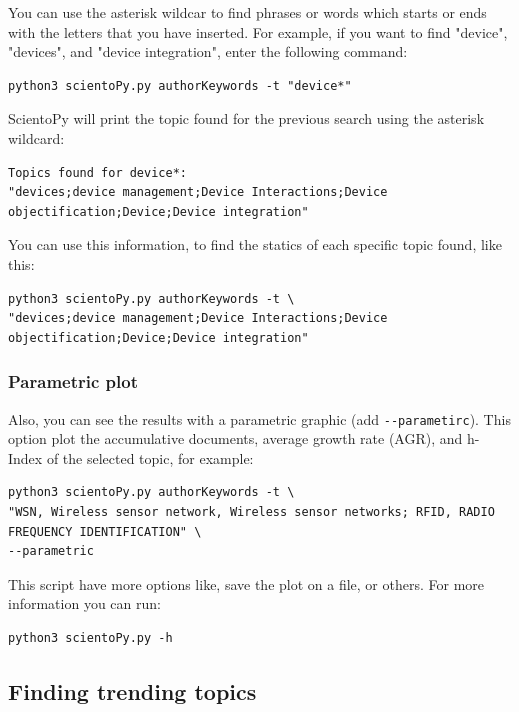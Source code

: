 \documentclass[10pt,letterpaper]{article}
\begin{document}
You can use the asterisk wildcar to find phrases or words which starts or ends with the letters that you have inserted. For example, if you want to find "device", "devices", and "device integration", enter the following command: 

\begin{verbatim}
python3 scientoPy.py authorKeywords -t "device*"
\end{verbatim}

ScientoPy will print the topic found for the previous search using the asterisk wildcard: 

\begin{verbatim}
Topics found for device*:
"devices;device management;Device Interactions;Device objectification;Device;Device integration"
\end{verbatim}

You can use this information, to find the statics of each specific topic found, like this: 

\begin{verbatim}
python3 scientoPy.py authorKeywords -t \
"devices;device management;Device Interactions;Device objectification;Device;Device integration"
\end{verbatim}



\subsubsection{Parametric plot}

Also, you can see the results with a parametric graphic (add \verb|--parametirc|). This option plot the accumulative documents, average growth rate (AGR), and h-Index of the selected topic, for example:

\begin{verbatim}
python3 scientoPy.py authorKeywords -t \
"WSN, Wireless sensor network, Wireless sensor networks; RFID, RADIO FREQUENCY IDENTIFICATION" \
--parametric
\end{verbatim}

This script have more options like, save the plot on a file, or others. For more information you can run:

\begin{verbatim}
python3 scientoPy.py -h
\end{verbatim}

\subsection{Finding trending topics}
\end{document}
